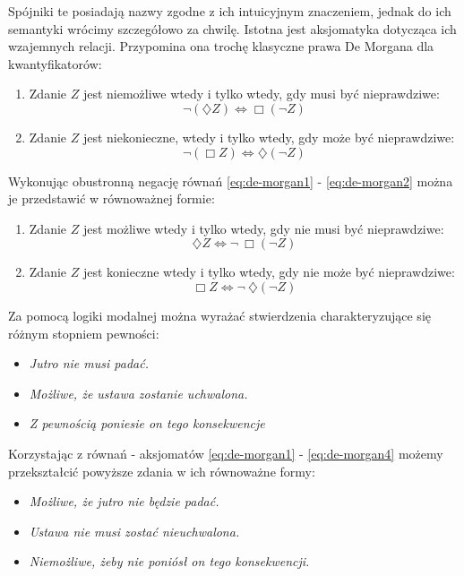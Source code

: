 \documentclass{article}
\begin{document}
Spójniki te posiadają nazwy zgodne z ich intuicyjnym znaczeniem, jednak do ich semantyki wrócimy szczegółowo za chwilę. Istotna jest aksjomatyka dotycząca ich wzajemnych relacji. Przypomina ona trochę klasyczne prawa De Morgana dla kwantyfikatorów: 

\begin{enumerate}
	\item Zdanie $Z$ jest niemożliwe wtedy i tylko wtedy, gdy musi być nieprawdziwe:
	\begin{equation} \label{eq:de-morgan1}
	\neg \left( \diamondsuit Z \right) \Leftrightarrow \Box \left( \neg Z \right)
	\end{equation}
	\item Zdanie $Z$ jest niekonieczne, wtedy i tylko wtedy, gdy może być nieprawdziwe:
	\begin{equation} \label{eq:de-morgan2}
	\neg \left( \Box Z \right) \Leftrightarrow \diamondsuit \left( \neg Z \right)
	\end{equation}
\end{enumerate}

Wykonując obustronną negację równań \ref{eq:de-morgan1} - \ref{eq:de-morgan2} można je przedstawić w równoważnej formie: 

\begin{enumerate}
	\item Zdanie $Z$ jest możliwe wtedy i tylko wtedy, gdy nie musi być nieprawdziwe:
	\begin{equation} \label{eq:de-morgan3}
	\diamondsuit Z \Leftrightarrow \neg \ \Box \left( \neg Z \right)
	\end{equation}
	\item Zdanie $Z$ jest konieczne wtedy i tylko wtedy, gdy nie może być nieprawdziwe:
	\begin{equation} \label{eq:de-morgan4}
	\Box Z \Leftrightarrow \neg \ \diamondsuit \left( \neg Z \right)
	\end{equation}
\end{enumerate}

Za pomocą logiki modalnej można wyrażać stwierdzenia charakteryzujące się różnym stopniem pewności:
\begin{itemize}
	\item \emph{Jutro nie musi padać. }
	\item \emph{Możliwe, że ustawa zostanie uchwalona. }
	\item \emph{Z pewnością poniesie on tego konsekwencje}
\end{itemize}
Korzystając z równań - aksjomatów \ref{eq:de-morgan1} - \ref{eq:de-morgan4} możemy przekształcić powyższe zdania w ich równoważne formy:
\begin{itemize}
	\item \emph{Możliwe, że jutro nie będzie padać. }
	\item \emph{Ustawa nie musi zostać nieuchwalona. }
	\item \emph{Niemożliwe, żeby nie poniósł on tego konsekwencji. } 
\end{itemize}
\end{document}
